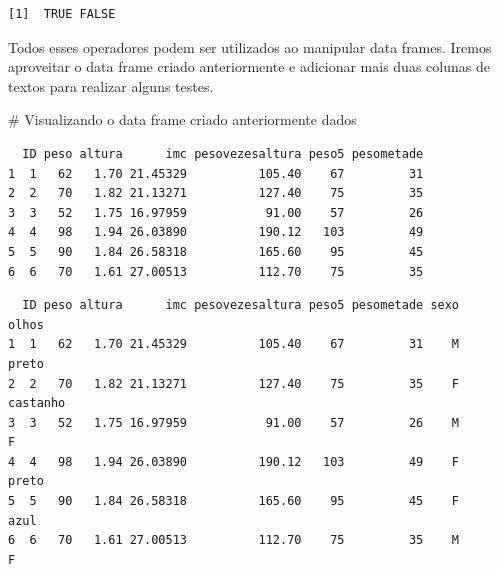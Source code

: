 \documentclass[
  letterpaper,
  DIV=11,
  numbers=noendperiod]{scrreprt}
\newenvironment{Shaded}{\begin{snugshade}}{\end{snugshade}}
\newcommand{\CommentTok}[1]{\textcolor[rgb]{0.37,0.37,0.37}{#1}}
\newcommand{\FunctionTok}[1]{\textcolor[rgb]{0.28,0.35,0.67}{#1}}
\newcommand{\NormalTok}[1]{\textcolor[rgb]{0.00,0.23,0.31}{#1}}
\newcommand{\OtherTok}[1]{\textcolor[rgb]{0.00,0.23,0.31}{#1}}
\newcommand{\SpecialCharTok}[1]{\textcolor[rgb]{0.37,0.37,0.37}{#1}}
\newcommand{\StringTok}[1]{\textcolor[rgb]{0.13,0.47,0.30}{#1}}
\begin{document}
\begin{verbatim}
[1]  TRUE FALSE
\end{verbatim}

Todos esses operadores podem ser utilizados ao manipular data frames.
Iremos aproveitar o data frame criado anteriormente e adicionar mais
duas colunas de textos para realizar alguns testes.

\begin{Shaded}
\begin{Highlighting}[]
\CommentTok{\# Visualizando o data frame criado anteriormente}
\NormalTok{dados}
\end{Highlighting}
\end{Shaded}

\begin{verbatim}
  ID peso altura      imc pesovezesaltura peso5 pesometade
1  1   62   1.70 21.45329          105.40    67         31
2  2   70   1.82 21.13271          127.40    75         35
3  3   52   1.75 16.97959           91.00    57         26
4  4   98   1.94 26.03890          190.12   103         49
5  5   90   1.84 26.58318          165.60    95         45
6  6   70   1.61 27.00513          112.70    75         35
\end{verbatim}

\begin{Shaded}
\end{Shaded}

\begin{verbatim}
  ID peso altura      imc pesovezesaltura peso5 pesometade sexo    olhos
1  1   62   1.70 21.45329          105.40    67         31    M    preto
2  2   70   1.82 21.13271          127.40    75         35    F castanho
3  3   52   1.75 16.97959           91.00    57         26    M        F
4  4   98   1.94 26.03890          190.12   103         49    F    preto
5  5   90   1.84 26.58318          165.60    95         45    F     azul
6  6   70   1.61 27.00513          112.70    75         35    M        F
\end{verbatim}
\end{document}
